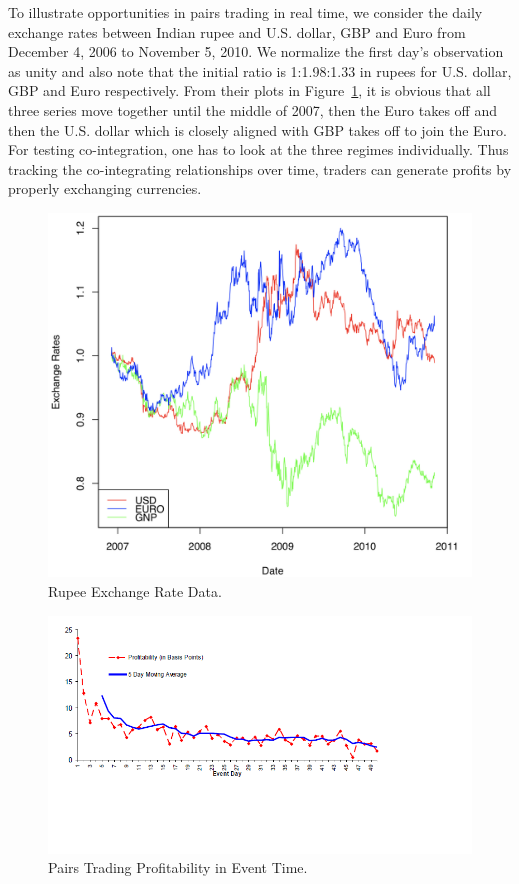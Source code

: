 To illustrate opportunities in pairs trading in real time, we consider the daily exchange rates between Indian rupee and U.S. dollar, GBP and Euro from December 4, 2006 to November 5, 2010. We normalize the first day's observation as unity and also note that the initial ratio is 1:1.98:1.33 in rupees for U.S. dollar, GBP and Euro respectively. From their plots in Figure~\ref{fig:rupee}, it is obvious that all three series move together until the middle of 2007, then the Euro takes off and then the U.S. dollar which is closely aligned with GBP takes off to join the Euro. For testing co-integration, one has to look at the three regimes individually. Thus tracking the co-integrating relationships over time, traders can generate profits by properly exchanging currencies.


	\begin{figure}[!ht]
	\centering
	\includegraphics[width=\textwidth]{chapters/chapter_stat_ts/figures/473.png}
	\caption{Rupee Exchange Rate Data. \label{fig:rupee}}
	\end{figure}

	\begin{figure}[!ht]
	\centering
	\includegraphics[width=\textwidth]{chapters/chapter_stat_ts/figures/Sec4-7Fig4.png}
	\caption{Pairs Trading Profitability in Event Time. \label{fig:pairsprofit}}
	\end{figure}


